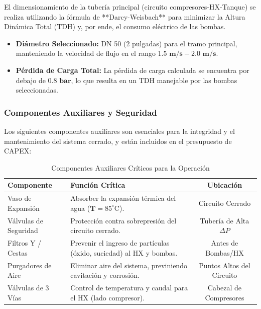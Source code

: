 \documentclass[11pt, a4paper]{article}
\begin{document}
El dimensionamiento de la tubería principal (circuito compresores-HX-Tanque) se realiza utilizando la fórmula de **Darcy-Weisbach** para minimizar la Altura Dinámica Total (TDH) y, por ende, el consumo eléctrico de las bombas.

\begin{itemize}[noitemsep, topsep=2pt]
    \item \textbf{Diámetro Seleccionado:} DN 50 (2 pulgadas) para el tramo principal, manteniendo la velocidad de flujo en el rango $\mathbf{1.5 \text{ m/s} - 2.0 \text{ m/s}}$.
    \item \textbf{Pérdida de Carga Total:} La pérdida de carga calculada se encuentra por debajo de $\mathbf{0.8 \text{ bar}}$, lo que resulta en un TDH manejable por las bombas seleccionadas.
\end{itemize}

\subsubsection{Componentes Auxiliares y Seguridad}

Los siguientes componentes auxiliares son esenciales para la integridad y el mantenimiento del sistema cerrado, y están incluidos en el presupuesto de CAPEX:

\begin{table}[H]
    \centering
    \caption{Componentes Auxiliares Críticos para la Operación}
    \begin{tabular}{p{3.5cm} p{6cm} c}
        \toprule
        \textbf{Componente} & \textbf{Función Crítica} & \textbf{Ubicación} \\
        \midrule
        Vaso de Expansión & Absorber la expansión térmica del agua ($\mathbf{T} = 85^{\circ}\text{C}$). & Circuito Cerrado \\
        Válvulas de Seguridad & Protección contra sobrepresión del circuito cerrado. & Tubería de Alta $\Delta P$ \\
        Filtros Y / Cestas & Prevenir el ingreso de partículas (óxido, suciedad) al HX y bombas. & Antes de Bombas/HX \\
        Purgadores de Aire & Eliminar aire del sistema, previniendo cavitación y corrosión. & Puntos Altos del Circuito \\
        Válvulas de 3 Vías & Control de temperatura y caudal para el HX (lado compresor). & Cabezal de Compresores \\
        \bottomrule
    \end{tabular}
\end{table}
\end{document}
